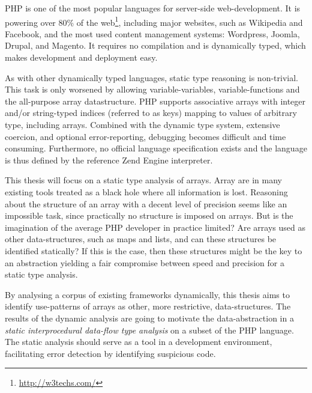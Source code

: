 PHP is one of the most popular languages for server-side web-development. It is powering over 80\% of the web\footnote{\url{http://w3techs.com/}}, including major websites, such as Wikipedia and Facebook, and the most used content management systems: Wordpress, Joomla, Drupal, and Magento. It requires no compilation and is dynamically typed, which makes development and deployment easy. 

As with other dynamically typed languages, static type reasoning is non-trivial. This task is only worsened by allowing variable-variables, variable-functions and the all-purpose array datastructure. PHP supports associative arrays with integer and/or string-typed indices (referred to as keys) mapping to values of arbitrary type, including arrays. Combined with the dynamic type system, extensive coercion, and optional error-reporting, debugging becomes difficult and time consuming. Furthermore, no official language specification exists and the language is thus defined by the reference Zend Engine interpreter.


This thesis will focus on a static type analysis of arrays. Array are in many existing tools treated as a black hole where all information is lost.  Reasoning about the structure of an array with a decent level of precision seems like an impossible task, since practically no structure is imposed on arrays. But is the imagination of the average PHP developer in practice limited? Are arrays used as other data-structures, such as maps and lists, and can these structures be identified statically? If this is the case, then these structures might be the key to an abstraction yielding a fair compromise between speed and precision for a static type analysis. 

By analysing a corpus of existing frameworks dynamically, this thesis aims to identify use-patterns of arrays as other, more restrictive, data-structures. The results of the dynamic analysis are going to motivate the data-abstraction in a \emph{static interprocedural data-flow type analysis} on a subset of the PHP language. The static analysis should serve as a tool in a development environment, facilitating error detection by identifying suspicious code. 


